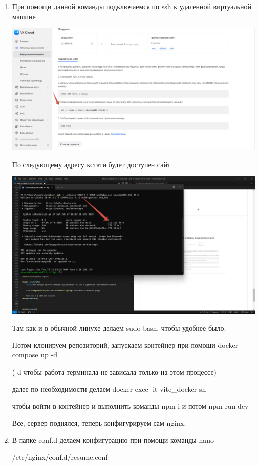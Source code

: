 \documentclass[14pt, a4paper]{extarticle}
\begin{document}
\begin{enumerate}
    \item При помощи данной команды подключаемся по ssh к удаленной виртуальной машине
    
    \includegraphics*[width=0.8\linewidth]{img/2024-02-17-19-39-01.png}
    
    По следующему адресу кстати будет доступен сайт
    
    \includegraphics*[width=0.8\linewidth]{img/2024-02-17-19-54-30.png}
    
    Там как и в обычной линухе делаем sudo bash, чтобы удобнее было.
    
    Потом клонируем репозиторий, запускаем контейнер при помощи docker-compose up -d 
    
    (-d чтобы работа терминала не зависала только на этом процессе)
    
    далее по необходимости делаем docker exec -it vite\_docker sh
    
    чтобы войти в контейнер и выполнить команды npm i и потом npm run dev 
    
    Все, сервер поднялся, теперь конфигурируем сам nginx. 

    \item В папке conf.d делаем конфигурацию при помощи команды nano 
    
    /etc/nginx/conf.d/resume.conf 
    

\end{enumerate}
\end{document}
